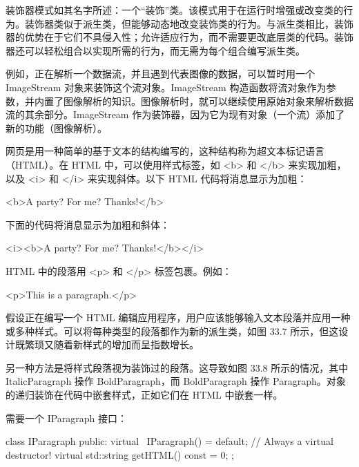
装饰器模式如其名字所述：一个“装饰”类。该模式用于在运行时增强或改变类的行为。装饰器类似于派生类，但能够动态地改变装饰类的行为。与派生类相比，装饰器的优势在于它们不具侵入性；允许适应行为，而不需要更改底层类的代码。装饰器还可以轻松组合以实现所需的行为，而无需为每个组合编写派生类。

例如，正在解析一个数据流，并且遇到代表图像的数据，可以暂时用一个 ImageStream 对象来装饰这个流对象。ImageStream 构造函数将流对象作为参数，并内置了图像解析的知识。图像解析时，就可以继续使用原始对象来解析数据流的其余部分。ImageStream 作为装饰器，因为它为现有对象（一个流）添加了新的功能（图像解析）。


网页是用一种简单的基于文本的结构编写的，这种结构称为超文本标记语言（HTML）。在 HTML 中，可以使用样式标签，如 <b> 和 </b> 来实现加粗，以及 <i> 和 </i> 来实现斜体。以下 HTML 代码将消息显示为加粗：

\begin{shell}
<b>A party? For me? Thanks!</b>
\end{shell}

下面的代码将消息显示为加粗和斜体：

\begin{shell}
<i><b>A party? For me? Thanks!</b></i>
\end{shell}

HTML 中的段落用 <p> 和 </p> 标签包裹。例如：

\begin{shell}
<p>This is a paragraph.</p>
\end{shell}

假设正在编写一个 HTML 编辑应用程序，用户应该能够输入文本段落并应用一种或多种样式。可以将每种类型的段落都作为新的派生类，如图 33.7 所示，但这设计既繁琐又随着新样式的增加而呈指数增长。


另一种方法是将样式段落视为装饰过的段落。这导致如图 33.8 所示的情况，其中 ItalicParagraph 操作 BoldParagraph，而 BoldParagraph 操作 Paragraph。对象的递归装饰在代码中嵌套样式，正如它们在 HTML 中嵌套一样。



需要一个 IParagraph 接口：

\begin{cpp}
class IParagraph
{
    public:
        virtual ~IParagraph() = default; // Always a virtual destructor!
        virtual std::string getHTML() const = 0;
};
\end{cpp}

